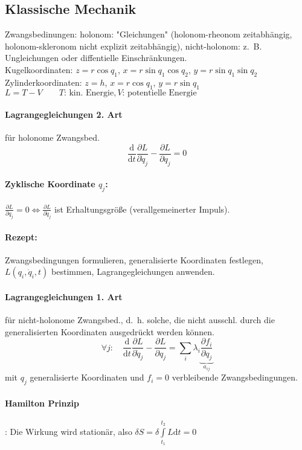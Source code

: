 \documentclass[a4paper, 11pt, fleqn]{article}
\newcommand{\md}{\mathrm{d}}
\newcommand{\pd}[2]{\frac{\partial #1}{\partial #2}}
\newcommand{\ad}[2]{\frac{\md #1}{\md #2}}
\begin{document}
\begin{multicols}{2}
\section{Klassische Mechanik}
Zwangsbedinungen: holonom: "Gleichungen" (holonom-rheonom zeitabhängig, holonom-skleronom nicht explizit zeitabhängig), nicht-holonom: z.~B. Ungleichungen oder diffentielle Einschränkungen.\\
Kugelkoordinaten: $z=r\cos q_1$, $x=r\sin q_1\cos q_2$, $y=r\sin q_1\sin q_2$\\
Zylinderkoordinaten: $z=h$, $x=r\cos q_1$, $y=r\sin q_1$\\
$L=T-V \qquad T\text{: kin. Energie}, V\text{: potentielle Energie}$\\
\paragraph{Lagrangegleichungen 2. Art} für holonome Zwangsbed.
\[\ad{}{t} \pd{L}{\dot q_j} - \pd{L}{q_j}=0\]
\paragraph{Zyklische Koordinate $q_j$:} $\pd{L}{q_j} = 0 \Leftrightarrow \pd{L}{\dot q_j}$ ist Erhaltungsgröße (verallgemeinerter Impuls).
\paragraph{Rezept:} Zwangsbedingungen formulieren, generalisierte Koordinaten festlegen, $L(q_i, \dot q_i, t)$ bestimmen, Lagrangegleichungen anwenden.

\paragraph{Lagrangegleichungen 1. Art} für nicht-holonome Zwangsbed., d.~h. solche, die nicht ausschl. durch die generalisierten Koordinaten ausgedrückt werden können.
\[\forall j: \quad \ad{}{t} \pd{L}{\dot q_j} - \pd{L}{q_j} = \sum\limits_i \lambda_i \underbrace{\pd{f_i}{q_j}}_{a_{ij}}\]
mit $q_j$ generalisierte Koordinaten und $f_i=0$ verbleibende Zwangsbedingungen.

\paragraph{Hamilton Prinzip}: Die Wirkung wird stationär, also $\delta S = \delta \int\limits_{t_1}^{t_2}L\md t = 0$


\end{multicols}
\end{document}
